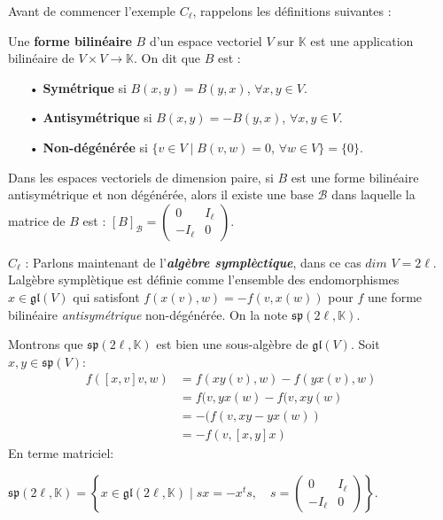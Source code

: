\documentclass[a4paper,openany,12pt]{report}
\newcommand{\KK}{\mathbb{K}}
\newcommand{\gl}{\mathfrak{gl}}
\newcommand{\ssp}{\mathfrak{sp}}
\theoremstyle{break}
{\theorembodyfont{\upshape}
\newtheorem*{rmq}{Remarque :}
\newtheorem*{prv}{Preuve :}
\newtheorem*{ex}{Exemples :}
\newtheorem*{exe}{Exemple : }
\newtheorem*{nota}{Notation :}
\newtheorem*{dem}{D\'emonstration :}}
\begin{document}
Avant de commencer l'exemple $ C_{\ell} $, rappelons les définitions suivantes :

\begin{df} 
\quad Une \textbf{forme bilinéaire} $B$ d'un espace vectoriel $V$ sur $\KK$ est une application bilinéaire de $V\times V\to  \KK$. 
On dit que $B$ est : 
\begin{itemize}
\item[•] \textbf{Symétrique} si $B(x,y)=B(y,x)$, $\forall x,y \in V$. 

\item[•] \textbf{Antisymétrique} si $B(x,y)=-B(y,x)$,  $\forall x,y \in V$. 

\item[•] \textbf{Non-dégénérée} si $\{ v \in V \mid B(v,w)=0$, $\forall w \in V \}= \{ 0 \}$.
\end{itemize}
\end{df}

\begin{rmq} 
\quad Dans  les espaces vectoriels de dimension paire, si $B$ est une forme bilinéaire antisymétrique et non dégénérée, alors il existe une base $\mathcal{B}$ dans laquelle la matrice de $B$ est : $[ B ]_\mathcal{B}=\begin{pmatrix} 0 & I_\ell \\ -I_\ell & 0 \end{pmatrix} $.
\end{rmq}

$ C_{\ell} $ : Parlons maintenant de l'\emph{\textbf{algèbre symplèctique}}, dans ce cas $dim$ $V=2 \ell$. Lalgèbre symplètique est définie comme l'ensemble des endomorphismes $x \in \gl(V)$ qui satisfont $f(x(v),w)=-f(v,x(w))$ pour $f$ une forme bilinéaire \textit{antisymétrique} non-dégénérée. On la note $\ssp (2\ell,\KK)$.

Montrons que $\ssp(2 \ell,\KK)$ est bien une sous-algèbre de $\gl(V)$. 
Soit $ x,y \in \ssp (V) $:
\begin{align*}
f([x,v]v ,w) &= f(xy(v),w)-f(yx(v),w) \\
           &= f(v,yx(w)-f(v,xy(w) \\
           &= -(f(v,xy-yx(w) )\\
           &=-f(v,[x,y]x)
\end{align*} 
En terme matriciel:

$\ssp (2 \ell,\KK)= \left \{ x\in \gl(2\ell,\KK) \mid sx=-x^ts, \quad s=\begin{pmatrix} 0 & I_\ell \\ -I_\ell & 0 \end{pmatrix} \right \}$.
\end{document}
